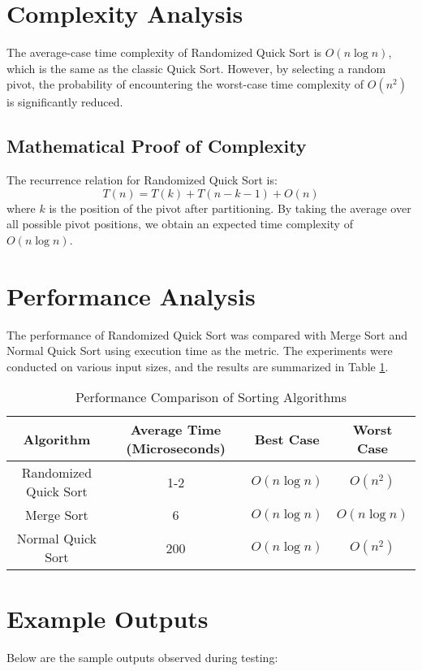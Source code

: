 \documentclass{article}
\begin{document}
\section{Complexity Analysis}
The average-case time complexity of Randomized Quick Sort is $O(n \log n)$, which is the same as the classic Quick Sort. However, by selecting a random pivot, the probability of encountering the worst-case time complexity of $O(n^2)$ is significantly reduced.

\subsection{Mathematical Proof of Complexity}
The recurrence relation for Randomized Quick Sort is:
\begin{equation}
    T(n) = T(k) + T(n - k - 1) + O(n)
\end{equation}
where $k$ is the position of the pivot after partitioning. By taking the average over all possible pivot positions, we obtain an expected time complexity of $O(n \log n)$.

\section{Performance Analysis}
The performance of Randomized Quick Sort was compared with Merge Sort and Normal Quick Sort using execution time as the metric. The experiments were conducted on various input sizes, and the results are summarized in Table \ref{tab:performance}.

\begin{table}[h]
    \centering
    \begin{tabular}{|c|c|c|c|}
        \hline
        Algorithm & Average Time (Microseconds) & Best Case & Worst Case \\
        \hline
        Randomized Quick Sort & 1-2 & $O(n \log n)$ & $O(n^2)$ \\
        Merge Sort & 6 & $O(n \log n)$ & $O(n \log n)$ \\
        Normal Quick Sort & 200 & $O(n \log n)$ & $O(n^2)$ \\
        \hline
    \end{tabular}
    \caption{Performance Comparison of Sorting Algorithms}
    \label{tab:performance}
\end{table}

\section{Example Outputs}
Below are the sample outputs observed during testing:
\end{document}
